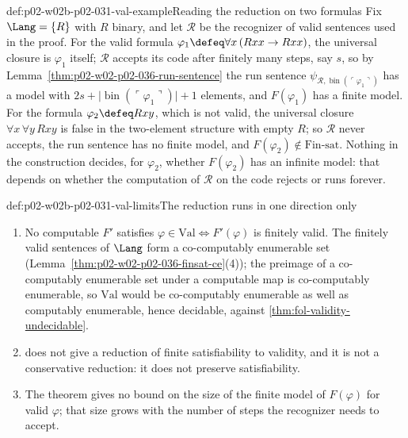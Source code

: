 \begin{hbexample}{def:p02-w02b-p02-031-val-example}{Reading the reduction on two formulas}
Fix \(\Lang=\{R\}\) with \(R\) binary, and let \(\mathcal R\) be the
recognizer of valid sentences used in the proof.  For the valid formula
\(\varphi_1\defeq\forall x\,(Rxx\to Rxx)\), the universal closure is
\(\varphi_1\) itself; \(\mathcal R\) accepts its code after finitely many
steps, say \(s\), so by Lemma~\ref{thm:p02-w02-p02-036-run-sentence} the run
sentence \(\psi_{\mathcal R,\operatorname{bin}(\ulcorner\varphi_1\urcorner)}\)
has a model with \(2s+\lvert\operatorname{bin}(\ulcorner\varphi_1\urcorner)
\rvert+1\) elements, and \(F(\varphi_1)\) has a finite model.  For the formula
\(\varphi_2\defeq Rxy\), which is not valid, the universal closure
\(\forall x\,\forall y\,Rxy\) is false in the two-element structure with
empty \(R\); so \(\mathcal R\) never accepts, the run sentence has no finite
model, and \(F(\varphi_2)\notin\mathrm{Fin\text{-}sat}\).  Nothing in the
construction decides, for \(\varphi_2\), whether \(F(\varphi_2)\) has an
infinite model: that depends on whether the computation of \(\mathcal R\) on
the code rejects or runs forever.
\end{hbexample}

\begin{hbwarning}{def:p02-w02b-p02-031-val-limits}{The reduction runs in one direction only}
\begin{enumerate}
\item No computable \(F'\) satisfies
  \(\varphi\in\mathrm{Val}\iff F'(\varphi)\) is finitely valid.  The finitely
  valid sentences of \(\Lang\) form a co-computably enumerable set
  (Lemma~\ref{thm:p02-w02-p02-036-finsat-ce}(4)); the preimage of a
  co-computably enumerable set under a computable map is co-computably
  enumerable, so \(\mathrm{Val}\) would be co-computably enumerable as well as
  computably enumerable, hence decidable, against
  \cref{thm:fol-validity-undecidable}.
\item {} does not give a reduction of
  finite satisfiability to validity, and it is not a conservative reduction:
  it does not preserve satisfiability.
\item The theorem gives no bound on the size of the finite model of
  \(F(\varphi)\) for valid \(\varphi\); that size grows with the number of
  steps the recognizer needs to accept.
\end{enumerate}
\end{hbwarning}

